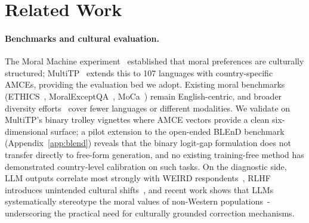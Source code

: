 \documentclass{article}
\begin{document}
\section{Related Work}
\label{sec:related}

\paragraph{Benchmarks and cultural evaluation.}
The Moral Machine experiment~\citep{awad2018moral} established that moral
preferences are culturally structured; MultiTP~\citep{jin2025multitp} extends
this to 107 languages with country-specific AMCEs, providing the evaluation bed
we adopt. Existing moral benchmarks
(ETHICS~\citep{hendrycks2021aligning}, MoralExceptQA~\citep{jin2022exceptions},
MoCa~\citep{nie2023moca}) remain English-centric, and broader diversity
efforts~\citep{kirk2024prism, durmus2023global, qiu2025cross} cover fewer
languages or different modalities. We validate on
MultiTP's binary trolley vignettes where AMCE vectors provide a clean
six-dimensional surface; a pilot extension to the open-ended BLEnD benchmark~\citep{myung2024blend} (Appendix~\ref{app:blend}) reveals that the binary logit-gap formulation does not transfer directly to free-form generation, and no existing training-free method has demonstrated country-level calibration on such tasks.
On the diagnostic side, LLM outputs correlate most strongly with WEIRD
respondents~\citep{santurkar2023opinions}, RLHF introduces unintended cultural
shifts~\citep{ryan2024unintended}, and recent work shows that LLMs
systematically stereotype the moral values of non-Western
populations~\citep{zewail2025moral}-underscoring the practical need for
culturally grounded correction mechanisms.
\end{document}
